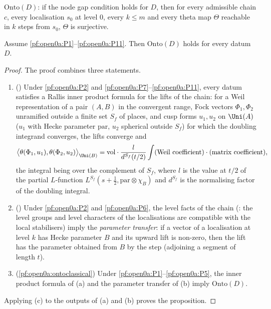 \begin{definition}\label{pf:open0a:def:onto}
$\mathrm{Onto}(D)$: if the node gap condition holds for $D$, then for every admissible chain $c$, every localisation
$s_0$ at level $0$, every $k\le m$ and every theta map $\Theta$ reachable in $k$ steps from $s_0$, $\Theta$ is
surjective.
\end{definition}

\begin{proposition}\label{pf:open0a:onto}
Assume \ref{pf:open0a:P1}--\ref{pf:open0a:P11}. Then $\mathrm{Onto}(D)$ holds for every datum $D$.
\ 
\end{proposition}

\begin{proof}
The proof combines three statements.
\begin{enumerate}[label=(\alph*)]
\item () Under \ref{pf:open0a:P2} and
\ref{pf:open0a:P7}--\ref{pf:open0a:P11}, every datum satisfies a Rallis inner product formula for the lifts of the
chain: for a Weil representation of a pair $(A,B)$ in the convergent range, Fock vectors $\Phi_1,\Phi_2$ unramified
outside a finite set $S_f$ of places, and cusp forms $u_1,u_2$ on $\Uni(A)$ ($u_1$ with Hecke parameter
$\mathrm{par}$, $u_2$ spherical outside $S_f$) for which the doubling integrand converges, the lifts converge and
\[
\bigl\langle\theta(\Phi_1,u_1),\theta(\Phi_2,u_2)\bigr\rangle_{\Uni(B)}
=\mathrm{vol}\cdot\frac{l}{d^{S_f}(t/2)}\int(\text{Weil coefficient})\cdot(\text{matrix coefficient}),
\]
the integral being over the complement of $S_f$, where $l$ is the value at $t/2$ of the partial $L$-function
$L^{S_f}(s+\frac12,\mathrm{par}\otimes\chi_B)$ and $d^{S_f}$ is the normalising factor of the doubling integral.
\item () Under \ref{pf:open0a:P2} and
\ref{pf:open0a:P6}, the level facts of the chain (: the level
groups and level characters of the localisations are compatible with the local stabilisers) imply the
\emph{parameter transfer}: if a vector of a localisation at level $k$ has Hecke parameter $B$ and its upward lift is
non-zero, then the lift has the parameter obtained from $B$ by the step (adjoining a segment of length $t$).
\item (\cref{pf:open0a:ontoclassical}) Under \ref{pf:open0a:P1}--\ref{pf:open0a:P5}, the inner product formula of (a)
and the parameter transfer of (b) imply $\mathrm{Onto}(D)$.
\end{enumerate}
Applying (c) to the outputs of (a) and (b) proves the proposition.
\end{proof}


